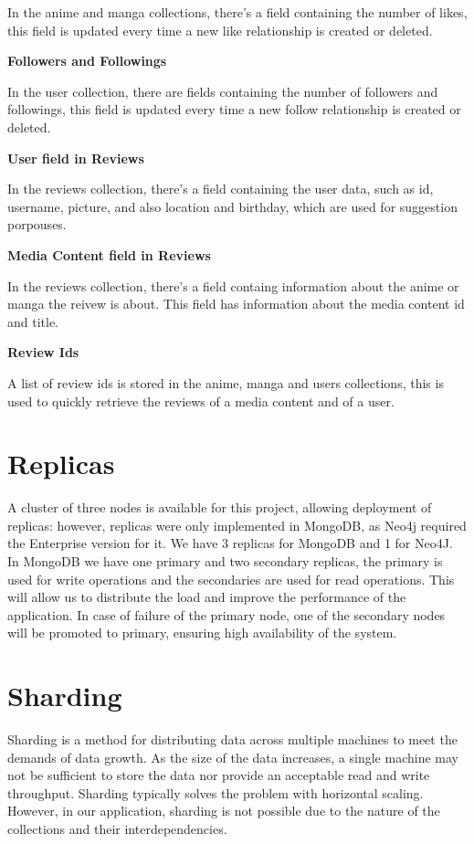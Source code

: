 In the anime and manga collections, there's a field containing the number of likes, this field is updated every time a new like relationship is created or deleted.


\textbf{Followers and Followings}


In the user collection, there are fields containing the number of followers and followings, this field is updated every time a new follow relationship is created or deleted.


\textbf{User field in Reviews}


In the reviews collection, there's a field containing the user data, such as id, username, picture, and also location and birthday, which are used for suggestion porpouses.

\textbf{Media Content field in Reviews}


In the reviews collection, there's a field containg information about the anime or manga the reivew is about. This field has information about the media content id and title.


\textbf{Review Ids}


A list of review ids is stored in the anime, manga and users collections, this is used to quickly retrieve the reviews of a media content and of a user.

\section{Replicas}
A cluster of three nodes is available for this project, allowing deployment of replicas: however, replicas were only implemented in MongoDB, as Neo4j required the Enterprise version for it.
We have 3 replicas for MongoDB and 1 for Neo4J.
In MongoDB we have one primary and two secondary replicas, the primary is used for write operations and the secondaries are used for read operations. This will allow us to distribute the load and improve the performance of the application. In case of failure of the primary node, one of the secondary nodes will be promoted to primary, ensuring high availability of the system.

\newpage
\section{Sharding}
Sharding is a method for distributing data across multiple machines to meet the demands of data growth. As the size of the data increases, a single machine may not be sufficient to store the data nor provide an acceptable read and write throughput. Sharding typically solves the problem with horizontal scaling. However, in our application, sharding is not possible due to the nature of the collections and their interdependencies.

